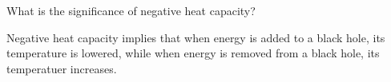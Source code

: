 \documentclass[12pt]{article}
\begin{document}
\begin{enumerate}
\begin{enumerate}
            What is the significance of negative heat capacity?

            Negative heat capacity implies that when energy is added to a black hole, its temperature is lowered, while when energy is removed from a black hole, its temperatuer increases.
    \end{enumerate}

\end{enumerate}
\end{document}

